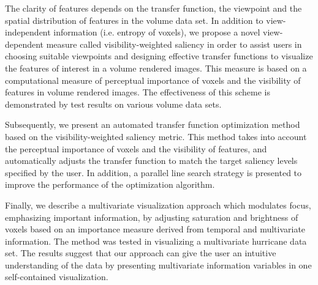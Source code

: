\documentclass[a4paper, 12pt, oneside]{report}         %
\begin{document}
\begin{thesisabstract}
The clarity of features depends on the transfer function, the viewpoint and the spatial distribution of features in the volume data set.
In addition to view-independent information (i.e. entropy of voxels), we propose a novel view-dependent measure called visibility-weighted saliency in order to assist users in choosing suitable viewpoints and designing effective transfer functions to visualize the features of interest in a volume rendered images. This measure is based on a computational measure of perceptual importance of voxels and the visibility of features in volume rendered images. The effectiveness of this scheme is demonstrated by test results on various volume data sets. 

Subsequently, we present an automated transfer function optimization method based on the visibility-weighted saliency metric. This method takes into account the perceptual importance of voxels and the visibility of features, and automatically adjusts the transfer function to match the target saliency levels specified by the user. In addition, a parallel line search strategy is presented to improve the performance of the optimization algorithm.

Finally, we describe a multivariate visualization approach which modulates focus, emphasizing important information, by adjusting saturation and brightness of voxels based on an importance measure derived from temporal and multivariate information.
The method was tested in visualizing a multivariate hurricane data set. The results suggest that our approach can give the user an intuitive understanding of the data by presenting multivariate information variables in one self-contained visualization.


\end{thesisabstract}
\end{document}
